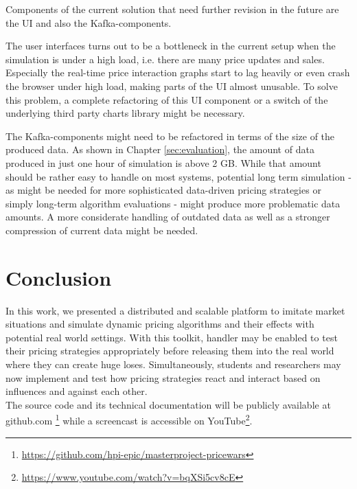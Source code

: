 Components of the current solution that need further revision in the future are the UI and also the Kafka-components.

The user interfaces turns out to be a bottleneck in the current setup when the simulation is under a high load, i.e. there are many price updates and sales. Especially the real-time price interaction graphs start to lag heavily or even crash the browser under high load, making parts of the UI almost unusable. To solve this problem, a complete refactoring of this UI component or a switch of the underlying third party charts library might be necessary.

The Kafka-components might need to be refactored in terms of the size of the produced data. As shown in Chapter \ref{sec:evaluation}, the amount of data produced in just one hour of simulation is above 2 GB. While that amount should be rather easy to handle on most systems, potential long term simulation - as might be needed for more sophisticated data-driven pricing strategies or simply long-term algorithm evaluations - might produce more problematic data amounts. A more considerate handling of outdated data as well as a stronger compression of current data might be needed. 



\section{Conclusion}
\label{sec:conclusion}
%
In this work, we presented a distributed and scalable platform to imitate market situations and simulate dynamic pricing algorithms and their effects with potential real world settings. With this toolkit, handler may be enabled to test their pricing strategies appropriately before releasing them into the real world where they can create huge loses. Simultaneously, students and researchers may now implement and test how pricing strategies react and interact based on influences and against each other.\\

The source code and its technical documentation will be publicly available at github.com \footnote{\url{https://github.com/hpi-epic/masterproject-pricewars}}
while a screencast is accessible on YouTube\footnote{\url{https://www.youtube.com/watch?v=bqXSi5cv8cE}}.\\

